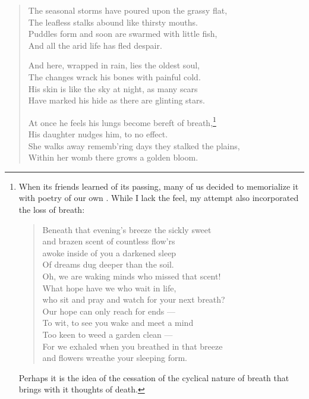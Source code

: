 \documentclass[12pt,oneside]{memoir}
\begin{document}
\begin{verse}
The seasonal storms have poured upon the grassy flat, \\
The leafless stalks abound like thirsty mouths. \\
Puddles form and soon are swarmed with little fish, \\
And all the arid life has fled despair.

And here, wrapped in rain, lies the oldest soul, \\
The changes wrack his bones with painful cold. \\
His skin is like the sky at night, as many scars \\
Have marked his hide as there are glinting stars.

At once he feels his lungs become bereft of breath,\footnote{When its friends learned of its passing, many of us decided to memorialize it with poetry of our own \parencite{memorial}. While I lack the feel, my attempt also incorporated the loss of breath: \begin{verse}Beneath that evening's breeze the sickly sweet \\ \vin and brazen scent of countless flow'rs \\ awoke inside of you a darkened sleep \\ \vin Of dreams dug deeper than the soil. \\ Oh, we are waking minds who missed that scent! \\ \vin What hope have we who wait in life, \\ who sit and pray and watch for your next breath? \\ \vin Our hope can only reach for ends --- \\ To wit, to see you wake and meet a mind \\ \vin Too keen to weed a garden clean --- \\ For we exhaled when you breathed in that breeze \\ \vin and flowers wreathe your sleeping form.\end{verse} Perhaps it is the idea of the cessation of the cyclical nature of breath that brings with it thoughts of death.} \\
His daughter nudges him, to no effect. \\
She walks away rememb'ring days they stalked the plains, \\
Within her womb there grows a golden bloom.

\parencite[26]{leaves}
\end{verse}
\end{document}
